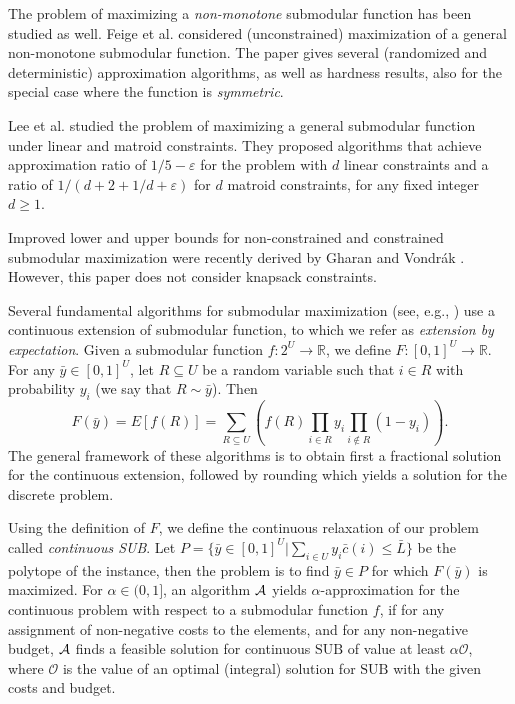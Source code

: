 \documentclass[11pt]{article}
\newcommand{\eps}{\varepsilon}
\newcommand{\comment}[1]{}
\newcommand{\cA}{{\cal A}}
\newcommand{\bL}{\bar{L}}
\newcommand{\bc}{\bar{c}}
\newcommand{\mO}{\mathcal{O}}
\newcommand{\SUB}{\mbox{SUB}}
\begin{document}
{The problem of maximizing a {\em non-monotone} submodular function has been studied as well. Feige et al. \cite{FMV07}
 considered (unconstrained) maximization of a  general non-monotone submodular function.
 The paper gives several (randomized and deterministic)
approximation algorithms, as well as hardness results, also for the special case
where the function is {\em symmetric}.

Lee et al. \cite{LMNS09} studied the problem of
maximizing a general submodular function under linear and matroid
constraints. They proposed algorithms that achieve approximation
ratio of $1/5 - \eps$ for  the problem with $d$ linear constraints
and a ratio of $1/(d+2+ 1/d + \eps)$ for $d$ matroid constraints,
for any fixed integer $d \geq 1$.

Improved lower and upper bounds for non-constrained and constrained submodular maximization
were recently derived by Gharan and Vondr\'{a}k
\cite{SV10}. However, this paper does not consider knapsack constraints.


\comment{ Submodular maximization problem where the focus of many
works. The best approximation ratio for maximizing non-monotone
submodular function without any constraints is $2/5-o(1)$ general
functions, and $1/2-\eps$ for symmetric function, both algorithm
are due to \cite{FMV07}. { {\bf write a survey of results for
constraints maximization}. For monotone functions mention the
classic greedy algorithm for cardinality and knapsack constraint.
Later matroid constraints, and afterwards our results. For
non-monotone mention Sviridenko. } }

Several fundamental algorithms for submodular maximization
(see, e.g., \cite{as04,ccpv07,Vo08,LMNS09})
use a continuous extension of submodular function, to which we
refer as \emph{extension by expectation}. Given a submodular
function $f: 2^U \rightarrow \mathbb{R}$, we define $F: [0,1]^U
\rightarrow \mathbb{R}$.
For any $\bar{y} \in [0,1]^U$, let $R \subseteq U$  be a random
variable such that $i\in R$ with probability $y_i$ (we say that
$R\sim \bar{y}$). Then
\begin{equation*}
F(\bar{y})= E[f(R)] =
\sum_{R \subseteq U} \left( f(R) \prod_{i\in R} y_i \prod_{i \notin
R} (1-y_i) \right).
\end{equation*}
The general framework of these algorithms is to obtain first a
fractional solution for the continuous extension, followed by
rounding which yields a solution for the discrete problem.

Using the definition of $F$, we define the continuous relaxation of our problem called
{\em continuous \SUB}. Let $P=\{\bar{y} \in [0,1]^U |
\sum_{i\in U} y_i{\bc}(i) \leq \bL\}$ be the polytope of the instance, then the problem
is to find $\bar{y}\in P$ for which $F(\bar{y})$ is
maximized. For $\alpha \in (0,1]$, an algorithm $\cA$ yields $\alpha$-approximation
 for the continuous problem with respect to a submodular
function $f$, if for any assignment of non-negative costs to the elements, and for any non-negative budget, $\cA$ finds a feasible solution for
continuous ${\SUB}$ of value at least $\alpha \mO$, where $\mO$ is the value of an optimal
(integral) solution for ${\SUB}$ with the given costs and budget.


}
\end{document}
